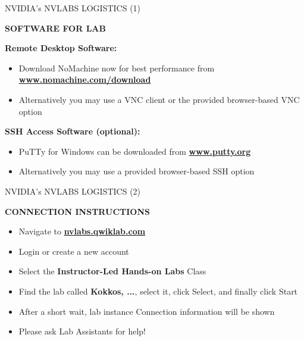 

\begin{frame}{NVIDIA's NVLABS LOGISTICS (1)}

\textbf{\large SOFTWARE FOR LAB}

\vspace{10pt}

\textbf{Remote Desktop Software:} \\
\begin{itemize}
\item {Download NoMachine now for best performance from \\
 \textbf{\ul{www.nomachine.com/download}}}
\item {Alternatively you may use a VNC client or the provided browser-based VNC option}
\end{itemize}

\vspace{10pt}

\textbf{SSH Access Software (optional):}
\begin{itemize}
\item PuTTy for Windows can be downloaded from \textbf{\ul{www.putty.org}}
\item{Alternatively you may use a provided browser-based SSH option}
\end{itemize}

\end{frame}


\begin{frame}{NVIDIA's NVLABS LOGISTICS (2)}

\textbf{\Large CONNECTION INSTRUCTIONS}
\begin{itemize}
\item {Navigate to \textbf{\ul{nvlabs.qwiklab.com}}}
\item {Login or create a new account}
\item {Select the \textbf{Instructor-Led Hands-on Labs} Class}
\item {Find the lab called \textbf{Kokkos, ...}, select it, click Select, and finally click Start}
\item {After a short wait, lab instance Connection information will be shown}
\item {Please ask Lab Assistants for help!}
\end{itemize}

\end{frame}


